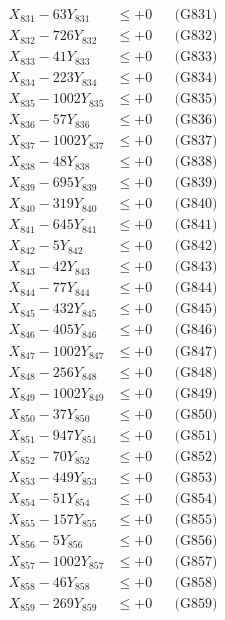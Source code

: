 \documentclass[a4paper,10pt]{article}
\begin{document}
{\begin{align}
\allowbreak
X_{831} - 63Y_{831} &\leq +0 && \text{(G831)} \\
X_{832} - 726Y_{832} &\leq +0 && \text{(G832)} \\
X_{833} - 41Y_{833} &\leq +0 && \text{(G833)} \\
X_{834} - 223Y_{834} &\leq +0 && \text{(G834)} \\
X_{835} - 1002Y_{835} &\leq +0 && \text{(G835)} \\
X_{836} - 57Y_{836} &\leq +0 && \text{(G836)} \\
X_{837} - 1002Y_{837} &\leq +0 && \text{(G837)} \\
X_{838} - 48Y_{838} &\leq +0 && \text{(G838)} \\
X_{839} - 695Y_{839} &\leq +0 && \text{(G839)} \\
X_{840} - 319Y_{840} &\leq +0 && \text{(G840)} \\
\allowbreak
X_{841} - 645Y_{841} &\leq +0 && \text{(G841)} \\
X_{842} - 5Y_{842} &\leq +0 && \text{(G842)} \\
X_{843} - 42Y_{843} &\leq +0 && \text{(G843)} \\
X_{844} - 77Y_{844} &\leq +0 && \text{(G844)} \\
X_{845} - 432Y_{845} &\leq +0 && \text{(G845)} \\
X_{846} - 405Y_{846} &\leq +0 && \text{(G846)} \\
X_{847} - 1002Y_{847} &\leq +0 && \text{(G847)} \\
X_{848} - 256Y_{848} &\leq +0 && \text{(G848)} \\
X_{849} - 1002Y_{849} &\leq +0 && \text{(G849)} \\
X_{850} - 37Y_{850} &\leq +0 && \text{(G850)} \\
\allowbreak
X_{851} - 947Y_{851} &\leq +0 && \text{(G851)} \\
X_{852} - 70Y_{852} &\leq +0 && \text{(G852)} \\
X_{853} - 449Y_{853} &\leq +0 && \text{(G853)} \\
X_{854} - 51Y_{854} &\leq +0 && \text{(G854)} \\
X_{855} - 157Y_{855} &\leq +0 && \text{(G855)} \\
X_{856} - 5Y_{856} &\leq +0 && \text{(G856)} \\
X_{857} - 1002Y_{857} &\leq +0 && \text{(G857)} \\
X_{858} - 46Y_{858} &\leq +0 && \text{(G858)} \\
X_{859} - 269Y_{859} &\leq +0 && \text{(G859)} \\

\end{align}}
\end{document}
